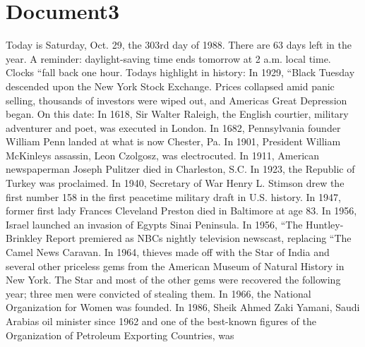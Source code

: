 \documentclass{article}
\begin{document}
\color[rgb]{0,0,0}\section{Document3}
\color[rgb]{0.9372549019607843,0.48627450980392156,0.396078431372549}Today is Saturday, Oct. 29, the 303rd day of 1988. There are 63 days left in the year. A reminder: daylight-saving time ends tomorrow at 2 a.m. local time. Clocks ``fall back one hour. Todays highlight in history: In 1929, ``Black Tuesday descended upon the New York \color[rgb]{0.9647058823529412,0.1568627450980392,0.9411764705882353}Stock Exchange. Prices collapsed amid \color[rgb]{0.9372549019607843,0.48627450980392156,0.396078431372549}panic selling, thousands of investors were wiped out, and Americas Great Depression began. On this date: In 1618, Sir Walter Raleigh, the English courtier, \color[rgb]{0.8666666666666667,0.11372549019607843,0.5411764705882353}military adventurer and \color[rgb]{0.9372549019607843,0.48627450980392156,0.396078431372549}poet, was executed in London. In 1682, Pennsylvania founder William Penn landed at what is now Chester, Pa. In 1901, President William McKinleys assassin, Leon Czolgosz, was electrocuted. In 1911, American newspaperman Joseph Pulitzer died in Charleston, S.C. In 1923, the \color[rgb]{0.7098039215686275,0.00392156862745098,0.15294117647058825}Republic of Turkey was proclaimed. In 1940, Secretary of \color[rgb]{0.9372549019607843,0.48627450980392156,0.396078431372549}War Henry L. Stimson drew the first number  158  in the first peacetime \color[rgb]{0.8666666666666667,0.11372549019607843,0.5411764705882353}military draft in U.S. \color[rgb]{0.9372549019607843,0.48627450980392156,0.396078431372549}history. In 1947, former first lady Frances Cleveland Preston died in Baltimore at age 83. In 1956, \color[rgb]{0.8666666666666667,0.11372549019607843,0.5411764705882353}Israel launched an invasion of Egypts \color[rgb]{0.7098039215686275,0.00392156862745098,0.15294117647058825}Sinai \color[rgb]{0.8666666666666667,0.11372549019607843,0.5411764705882353}Peninsula. In 1956, ``The Huntley-Brinkley Report premiered as \color[rgb]{0.9372549019607843,0.48627450980392156,0.396078431372549}NBCs nightly television \color[rgb]{0.8666666666666667,0.11372549019607843,0.5411764705882353}newscast, replacing ``The Camel News Caravan. In 1964, \color[rgb]{0.9372549019607843,0.48627450980392156,0.396078431372549}thieves made off with the Star of India and several other priceless gems from the American Museum of Natural History in New York. The Star and most of the other gems were recovered the following year; three men were \color[rgb]{0.9137254901960784,0.34509803921568627,0.1568627450980392}convicted of stealing \color[rgb]{0.9372549019607843,0.48627450980392156,0.396078431372549}them. In 1966, the National Organization for Women was founded. In 1986, \color[rgb]{0.8666666666666667,0.11372549019607843,0.5411764705882353}Sheik Ahmed Zaki Yamani, Saudi Arabias oil minister since 1962 and one of the \color[rgb]{0.9372549019607843,0.48627450980392156,0.396078431372549}best-known figures of the \color[rgb]{0.8666666666666667,0.11372549019607843,0.5411764705882353}Organization of Petroleum Exporting Countries, was 
\end{document}
